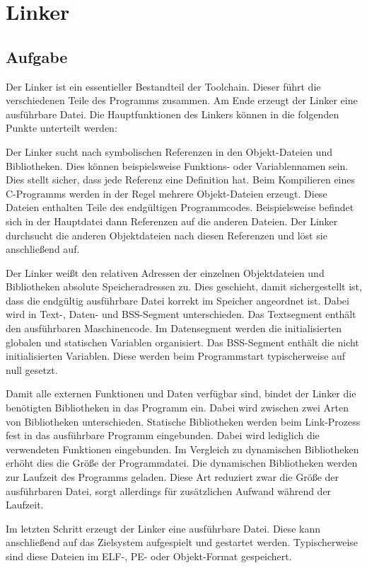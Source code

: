 \section{Linker}\label{kap:linker}

\subsection{Aufgabe}\label{kap:aufgabe_linker}
Der Linker ist ein essentieller Bestandteil der Toolchain.
Dieser führt die verschiedenen Teile des Programms zusammen.
Am Ende erzeugt der Linker eine ausführbare Datei.
Die Hauptfunktionen des Linkers können in die folgenden Punkte unterteilt werden:
\begin{description}[style=nextline]
	\item[Symbolauflösung] Der Linker sucht nach symbolischen Referenzen in den Objekt-Dateien und Bibliotheken.
	Dies können beispielsweise Funktions- oder Variablennamen sein.
	Dies stellt sicher, dass jede Referenz eine Definition hat.
	Beim Kompilieren eines C-Programms werden in der Regel mehrere Objekt-Dateien erzeugt.
	Diese Dateien enthalten Teile des endgültigen Programmcodes.
	Beispielsweise befindet sich in der Hauptdatei dann Referenzen auf die anderen Dateien.
	Der Linker durchsucht die anderen Objektdateien nach diesen Referenzen und löst sie anschließend auf.
	
	\item[Adresszuweisung] Der Linker weißt den relativen Adressen der einzelnen Objektdateien und Bibliotheken absolute Speicheradressen zu.
	Dies geschieht, damit sichergestellt ist, dass die endgültig ausführbare Datei korrekt im Speicher angeordnet ist.
	Dabei wird in Text-, Daten- und \ac{BSS}-Segment unterschieden.
	Das Textsegment enthält den ausführbaren Maschinencode.
	Im Datensegment werden die initialisierten globalen und statischen Variablen organisiert.
	Das \ac{BSS}-Segment enthält die nicht initialisierten Variablen.
	Diese werden beim Programmstart typischerweise auf null gesetzt.
	
	\item[Bibliotheken einbinden] Damit alle externen Funktionen und Daten verfügbar sind, bindet der Linker die benötigten Bibliotheken in das Programm ein.
	Dabei wird zwischen zwei Arten von Bibliotheken unterschieden.
	Statische Bibliotheken werden beim Link-Prozess fest in das ausführbare Programm eingebunden.
	Dabei wird lediglich die verwendeten Funktionen eingebunden.
	Im Vergleich zu dynamischen Bibliotheken erhöht dies die Größe der Programmdatei.
	Die dynamischen Bibliotheken werden zur Laufzeit des Programms geladen.
	Diese Art reduziert zwar die Größe der ausführbaren Datei, sorgt allerdings für zusätzlichen Aufwand während der Laufzeit.
	
	\item[Erstellen ausführbare Datei] Im letzten Schritt erzeugt der Linker eine ausführbare Datei.
	Diese kann anschließend auf das Zielsystem aufgespielt und gestartet werden.
	Typischerweise sind diese Dateien im \ac{ELF}-, \ac{PE}- oder Objekt-Format gespeichert.
\end{description}

